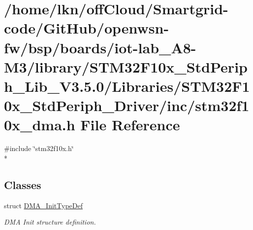 \hypertarget{iot-lab___a8-_m3_2library_2_s_t_m32_f10x___std_periph___lib___v3_85_80_2_libraries_2_s_t_m32_f101980f441ade0fd53d2775f39b98d9ef8}{}\section{/home/lkn/off\+Cloud/\+Smartgrid-\/code/\+Git\+Hub/openwsn-\/fw/bsp/boards/iot-\/lab\+\_\+\+A8-\/\+M3/library/\+S\+T\+M32\+F10x\+\_\+\+Std\+Periph\+\_\+\+Lib\+\_\+\+V3.5.0/\+Libraries/\+S\+T\+M32\+F10x\+\_\+\+Std\+Periph\+\_\+\+Driver/inc/stm32f10x\+\_\+dma.h File Reference}
\label{iot-lab___a8-_m3_2library_2_s_t_m32_f10x___std_periph___lib___v3_85_80_2_libraries_2_s_t_m32_f101980f441ade0fd53d2775f39b98d9ef8}
{\ttfamily \#include \char`\"{}stm32f10x.\+h\char`\"{}}\\*
\subsection*{Classes}
\begin{DoxyCompactItemize}
\item 
struct \hyperlink{struct_d_m_a___init_type_def}{D\+M\+A\+\_\+\+Init\+Type\+Def}
\begin{DoxyCompactList}\small\item\em D\+MA Init structure definition. \end{DoxyCompactList}\end{DoxyCompactItemize}
